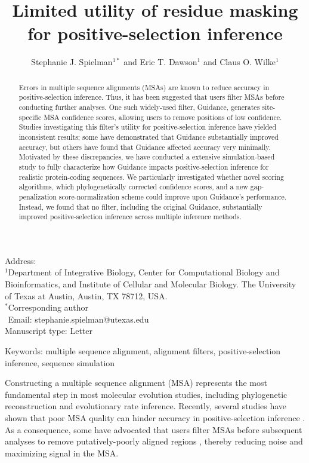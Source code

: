 \documentclass[11pt]{article}
\begin{document}
\title{\textbf{Limited utility of residue masking for positive-selection inference}}
\author{Stephanie J. Spielman$^{1*}$ and Eric T. Dawson$^{1}$ and Claus O. Wilke$^{1}$}
\date{}

\maketitle
\noindent
Address:\\
$^1$Department of Integrative Biology, Center for Computational Biology and Bioinformatics, and Institute of Cellular and Molecular Biology.
The University of Texas at Austin, Austin, TX 78712, USA.\\

\bigskip
\noindent
$^*$Corresponding author\\
$\phantom{^*}$Email: stephanie.spielman@utexas.edu\\

\bigskip
\noindent
Manuscript type: Letter

\bigskip
\noindent Keywords: multiple sequence alignment, alignment filters, positive-selection inference, sequence simulation

\newpage
\begin{abstract}
Errors in multiple sequence alignments (MSAs) are known to reduce accuracy in positive-selection inference. Thus, it has been suggested that users filter MSAs before conducting further analyses. One such widely-used filter, Guidance, generates site-specific MSA confidence scores, allowing users to remove positions of low confidence. Studies investigating this filter's utility for positive-selection inference have yielded inconsistent results; some have demonstrated that Guidance substantially improved accuracy, but others have found that Guidance affected accuracy very minimally. Motivated by these discrepancies, we have conducted a extensive simulation-based study to fully characterize how Guidance impacts positive-selection inference for realistic protein-coding sequences. We particularly investigated whether novel scoring algorithms, which phylogenetically corrected confidence scores, and a new gap-penalization score-normalization scheme could improve upon Guidance's performance. Instead, we found that no filter, including the original Guidance, substantially improved positive-selection inference across multiple inference methods. %
\end{abstract}


Constructing a multiple sequence alignment (MSA) represents the most fundamental step in most molecular evolution studies, including phylogenetic reconstruction and evolutionary rate inference. Recently, several studies have shown that poor MSA quality can hinder accuracy in positive-selection inference  \citep{Schneider2009, Fletcher2010, MarkovaRaina2011}. As a consequence, some have advocated that users filter MSAs before subsequent analyses to remove putatively-poorly aligned regions \citep{Privman2012,Jordan2012}, thereby reducing noise and maximizing signal in the MSA.
\end{document}
